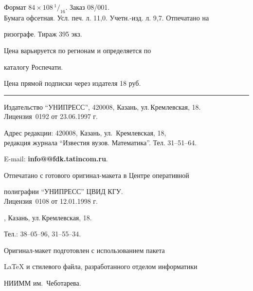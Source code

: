 Формат $84\times 108 \,^1/_{16}.$ Заказ 08/001.\\


Бумага офсетная. Усл. печ. л. 11,0. Учетн.-изд. л. 9,7. Отпечатано на 


ризографе. Тираж 395 экз. 





\noindent Цена варьируется по регионам и определяется по 


каталогу Роспечати. 





\noindent Цена прямой подписки через издателя 18 руб. 


\bigskip


\hrule


\bigskip


\noindent Издательство ``УНИПРЕСС'', 420008, Казань, ул.\,Кремлевская, 18.\\


Лицензия \No\,0192 от 23.06.1997 г.


\smallskip





\noindent Адрес редакции: 420008, Казань, ул.~Кремлевская, 18,\\  


редакция журнала  ``Известия вузов. Математика''. Тел. 31--51--64.





\noindent E-mail: {\bf info@@fdk.tatincom.ru}. \par


\bigskip 


\noindent Отпечатано с готового оригинал-макета в Центре оперативной


полиграфии ``УНИПРЕСС'' ЦВИД КГУ. \\


Лицензия \No\,0108 от 12.01.1998 г.





, Казань, ул.\,Кремлевская, 18.


Тел.: 38--05--96, 31--55--34. \par


\bigskip


\noindent Оригинал-макет подготовлен с использованием пакета


\AmS\LaTeX{} и стилевого файла, разработанного отделом информатики


НИИММ им.~Чеботарева.








